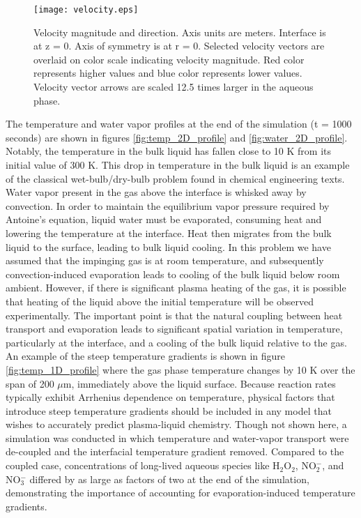 \begin{figure}[htb]
    \centering
        \texttt{[image: velocity.eps]}
    \caption{Velocity magnitude and direction. Axis units are meters. Interface is at z = 0. Axis of symmetry is at r = 0. Selected velocity vectors are overlaid on color scale indicating velocity magnitude. Red color represents higher values and blue color represents lower values. Velocity vector arrows are scaled 12.5 times larger in the aqueous phase.}
    \label{fig:v_field}
\end{figure}

The temperature and water vapor profiles at the end of the simulation (t = 1000 seconds) are shown in figures \ref{fig:temp_2D_profile} and \ref{fig:water_2D_profile}. Notably, the temperature in the bulk liquid has fallen close to 10 K from its initial value of 300 K. This drop in temperature in the bulk liquid is an example of the classical wet-bulb/dry-bulb problem found in chemical engineering texts. Water vapor present in the gas above the interface is whisked away by convection. In order to maintain the equilibrium vapor pressure required by Antoine's equation, liquid water must be evaporated, consuming heat and lowering the temperature at the interface. Heat then migrates from the bulk liquid to the surface, leading to bulk liquid cooling. In this problem we have assumed that the impinging gas is at room temperature, and subsequently convection-induced evaporation leads to cooling of the bulk liquid below room ambient. However, if there is significant plasma heating of the gas, it is possible that heating of the liquid above the initial temperature will be observed experimentally. The important point is that the natural coupling between heat transport and evaporation leads to significant spatial variation in temperature, particularly at the interface, and a cooling of the bulk liquid relative to the gas. An example of the steep temperature gradients is shown in figure \ref{fig:temp_1D_profile} where the gas phase temperature changes by 10 K over the span of 200 $\mu$m, immediately above the liquid surface. Because reaction rates typically exhibit Arrhenius dependence on temperature, physical factors that introduce steep temperature gradients should be included in any model that wishes to accurately predict plasma-liquid chemistry. Though not shown here, a simulation was conducted in which temperature and water-vapor transport were de-coupled and the interfacial temperature gradient removed. Compared to the coupled case, concentrations of long-lived aqueous species like H$_2$O$_2$, NO$_2^-$, and NO$_3^-$ differed by as large as factors of two at the end of the simulation, demonstrating the importance of accounting for evaporation-induced temperature gradients.

